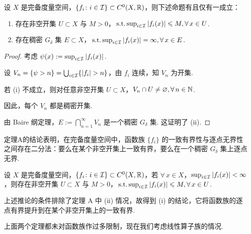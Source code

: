 \begin{theorem}[A]
    \wideline
    设 $X$ 是完备度量空间，$\{f_i \colon i \in \mathcal{I}\} \subset C^0(X, \mathbb{R})$，则下述命题有且仅有一成立：
    \begin{enumerate}[label=(\roman*)]
        \item 存在非空开集 $U \subset X$ 与 $M > 0$，$\operatorname{\,\text{s.t.}} \sup_{i \in \mathcal{I}} |f_i(x)| \leqslant M, \forall\, x \in U$.
        \item 存在稠密 $G_\delta$ 集 $E \subset X$，$\operatorname{\,\text{s.t.}} \sup_{i \in \mathcal{I}} |f_i(x)| = \infty, \forall\, x \in E$.
    \end{enumerate}
\end{theorem}
\begin{proof}
    考虑 $\psi(x) := \sup_{i \in \mathcal{I}} |f_i(x)|$.\par
    设 $V_n = \{\psi > n\} = \bigcup_{i \in \mathcal{I}} \{|f_i| > n\}$，由 $f_i$ 连续，知 $V_n$ 为开集.\par
    若 (i) 不成立，则对任意非空开集 $U \subset X$，$V_n \cap U \neq \varnothing, \forall\, n \in \mathbb{N}$.\par
    因此，每个 $V_n$ 都是稠密开集.\par
    由 Baire 纲定理，$E := \bigcap_{n=1}^\infty V_n$ 是一个稠密 $G_\delta$ 集. 这证明了 (ii).
\end{proof}
定理A的结论表明，在完备度量空间中，函数族 $\{f_i\}$ 的一致有界性与逐点无界性之间存在二分法：要么在某个非空开集上一致有界，要么在一个稠密 $G_\delta$ 集上逐点无界.

\begin{corollary}[B]
    设 $X$ 是完备度量空间，$\{f_i \colon i \in \mathcal{I}\} \subset C^0(X, \mathbb{R})$，若 $\forall\, x \in X$，$\sup_{i \in \mathcal{I}} |f_i(x)| < \infty$，则存在非空开集 $U \subset X$ 与 $M > 0$，$\operatorname{\,\text{s.t.}} \sup_{i \in \mathcal{I}} |f_i(x)| \leqslant M, \forall\, x \in U$.
\end{corollary}
上述推论的条件排除了定理 A 中 (ii) 情况，故得到 (i) 的结论，它将函数族的逐点有界提升到在某个非空开集上的一致有界.\par
上面两个定理都未对函数族作过多限制，现在我们考虑线性算子族的情况.

